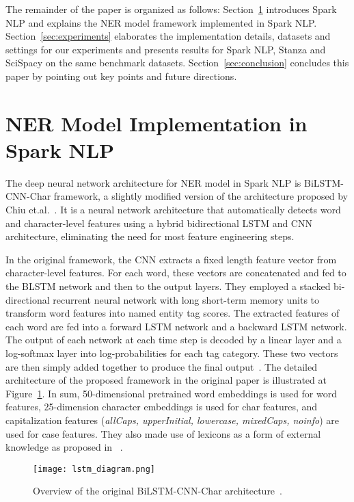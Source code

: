 \documentclass[a4paper,conference]{IEEEtran}
\begin{document}
The remainder of the paper is organized as follows: 
Section~\ref{sec:NerDL} introduces Spark NLP and explains the NER model framework implemented in Spark NLP.
Section~\ref{sec:experiments} elaborates the implementation details, datasets and settings for our experiments and presents results for Spark NLP, Stanza and SciSpacy on the same benchmark datasets. 
Section~\ref{sec:conclusion}  concludes this paper by pointing out key points and future directions.



\section{NER Model Implementation in Spark NLP}
\label{sec:NerDL}

The deep neural network architecture for NER model in Spark NLP is BiLSTM-CNN-Char framework, a slightly modified version of the architecture proposed by Chiu et.al.~\cite{chiu2016named}. It is a neural network architecture that automatically detects word and character-level features using a hybrid bidirectional LSTM and CNN architecture, eliminating the need for most feature engineering steps. 

In the original framework, the CNN extracts a fixed length feature vector from character-level features. For each word, these vectors are concatenated and fed to the BLSTM network and then to the output layers. They employed a stacked bi-directional recurrent neural network with long short-term memory units to transform word features into named entity tag scores. The extracted features of each word are fed into a forward LSTM network and a backward LSTM network. The output of each network at each time step is decoded by a linear layer and a log-softmax layer into log-probabilities for each tag category. These two vectors are then simply added together to produce the final output~\cite{chiu2016named}. The detailed architecture of the proposed framework in the original paper is illustrated at Figure~\ref{fig:ner_dl_diagram}. In sum, 50-dimensional pretrained word embeddings is used for word features, 25-dimension character embeddings is used for char features, and capitalization features (\textit{allCaps, upperInitial, lowercase, mixedCaps, noinfo}) are used for case features. They also made use of lexicons as a form of external knowledge as proposed in ~\cite{ratinov2009design}.


\begin{figure}[h]
\centering
\texttt{[image: lstm\_diagram.png]}
\centering
\caption{Overview of the original BiLSTM-CNN-Char architecture~\cite{chiu2016named}.}
\label{fig:ner_dl_diagram}
\end{figure}
\end{document}
